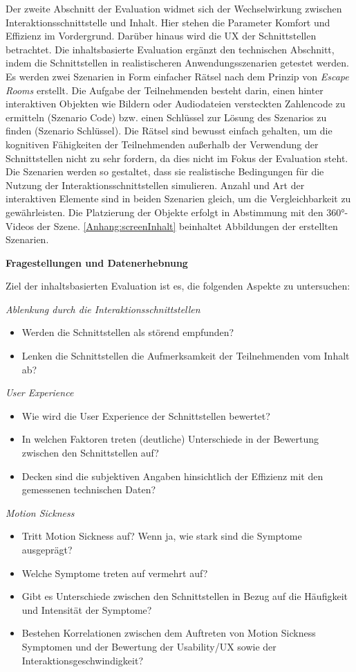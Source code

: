 Der zweite Abschnitt der Evaluation widmet sich der Wechselwirkung zwischen Interaktionsschnittstelle und Inhalt. Hier stehen die Parameter Komfort und Effizienz im Vordergrund. Darüber hinaus wird die UX der Schnittstellen betrachtet. Die inhaltsbasierte Evaluation ergänzt den technischen Abschnitt, indem die Schnittstellen in realistischeren Anwendungsszenarien getestet werden.
Es werden zwei Szenarien in Form einfacher Rätsel nach dem Prinzip von \textit{Escape Rooms} erstellt. Die Aufgabe der Teilnehmenden besteht darin, einen hinter interaktiven Objekten wie Bildern oder Audiodateien versteckten Zahlencode zu ermitteln (Szenario Code) bzw. einen Schlüssel zur Lösung des Szenarios zu finden (Szenario Schlüssel). Die Rätsel sind bewusst einfach gehalten, um die kognitiven Fähigkeiten der Teilnehmenden außerhalb der Verwendung der Schnittstellen nicht zu sehr fordern, da dies nicht im Fokus der Evaluation steht. Die Szenarien werden so gestaltet, dass sie realistische Bedingungen für die Nutzung der Interaktionsschnittstellen simulieren. Anzahl und Art der interaktiven Elemente sind in beiden Szenarien gleich, um die Vergleichbarkeit zu gewährleisten. Die Platzierung der Objekte erfolgt in Abstimmung mit den 360°-Videos der Szene. \autoref{Anhang:screenInhalt} beinhaltet Abbildungen der erstellten Szenarien. 

\textbf{Fragestellungen und Datenerhebnung}

Ziel der inhaltsbasierten Evaluation ist es, die folgenden Aspekte zu untersuchen:

\textit{Ablenkung durch die Interaktionsschnittstellen}
\begin{itemize}
    \item Werden die Schnittstellen als störend empfunden?
    \item Lenken die Schnittstellen die Aufmerksamkeit der Teilnehmenden vom Inhalt ab?
\end{itemize}
\textit{User Experience}
\begin{itemize}
    \item Wie wird die User Experience der Schnittstellen bewertet?
    \item In welchen Faktoren treten (deutliche) Unterschiede in der Bewertung zwischen den Schnittstellen auf? 
    \item Decken sind die subjektiven Angaben hinsichtlich der Effizienz mit den gemessenen technischen Daten?
\end{itemize}
\textit{Motion Sickness}
\begin{itemize}
    \item Tritt Motion Sickness auf? Wenn ja, wie stark sind die Symptome ausgeprägt?
    \item Welche Symptome treten auf vermehrt auf?
    \item Gibt es Unterschiede zwischen den Schnittstellen in Bezug auf die Häufigkeit und Intensität der Symptome?
    \item Bestehen Korrelationen zwischen dem Auftreten von Motion Sickness Symptomen und der Bewertung der Usability/UX sowie der Interaktionsgeschwindigkeit? 
\end{itemize}

